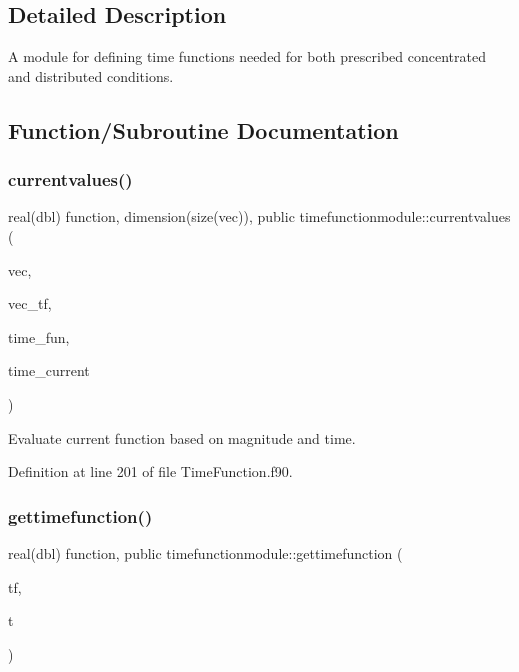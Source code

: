 \subsection{Detailed Description}
A module for defining time functions needed for both prescribed concentrated and distributed conditions. 

\subsection{Function/\+Subroutine Documentation}
\mbox{\label{namespacetimefunctionmodule_a907e0921288aa4f538e605c521686e4a}} 
\subsubsection{\texorpdfstring{currentvalues()}{currentvalues()}}
{\footnotesize\ttfamily real(dbl) function, dimension(size(vec)), public timefunctionmodule\+::currentvalues (\begin{DoxyParamCaption}\item[{real(dbl), dimension(\+:), intent(in)}]{vec,  }\item[{integer, dimension(\+:), intent(in)}]{vec\+\_\+tf,  }\item[{type (\hyperlink{structtimefunctionmodule_1_1timefunction}{timefunction}), dimension(\+:), intent(in)}]{time\+\_\+fun,  }\item[{real(dbl), intent(in)}]{time\+\_\+current }\end{DoxyParamCaption})}



Evaluate current function based on magnitude and time. 



Definition at line 201 of file Time\+Function.\+f90.

\mbox{\label{namespacetimefunctionmodule_a177d2096c59b79cbbfd85b4e05b57f29}} 
\subsubsection{\texorpdfstring{gettimefunction()}{gettimefunction()}}
{\footnotesize\ttfamily real(dbl) function, public timefunctionmodule\+::gettimefunction (\begin{DoxyParamCaption}\item[{type (\hyperlink{structtimefunctionmodule_1_1timefunction}{timefunction}), intent(in)}]{tf,  }\item[{real(dbl), intent(in)}]{t }\end{DoxyParamCaption})}



